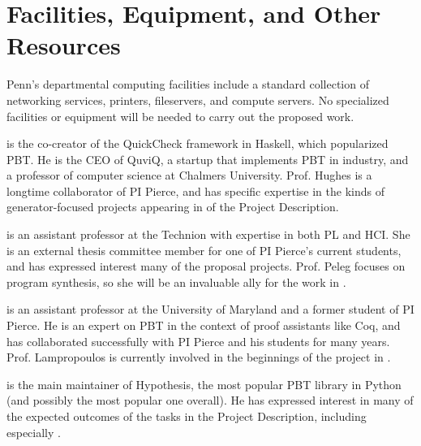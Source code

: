\section*{Facilities, Equipment, and Other Resources}

Penn's departmental computing facilities include a standard collection of
networking services, printers, fileservers, and compute servers.  No
specialized facilities or equipment will be needed to carry out the
proposed work.



 is the co-creator of the QuickCheck framework in
Haskell, which popularized PBT. He is the CEO of QuviQ, a startup that
implements PBT in industry, and a professor of computer science at Chalmers
University.  Prof. Hughes is a longtime collaborator of PI
Pierce, and has specific expertise in the kinds of generator-focused projects
appearing in  of the Project Description.

\smallskip{} is an assistant professor at the Technion with expertise in both
PL and HCI. She is an external thesis committee member for one of PI Pierce's current
students, and has expressed interest many of the proposal projects. Prof. Peleg
focuses on program synthesis, so she will be an invaluable ally for the work in
.

\smallskip{} is an assistant professor at the
University of Maryland and a former student of PI Pierce.  He is an expert on
PBT in the context of proof assistants like Coq, and has collaborated
successfully with PI Pierce and his students for many years. Prof. Lampropoulos
is currently involved in the beginnings of the project in
.

\smallskip{} is the main maintainer of
Hypothesis, the most popular PBT library in Python (and possibly the most
popular one overall). He has expressed interest in many of the expected outcomes
of the tasks in the Project Description, including especially
.
